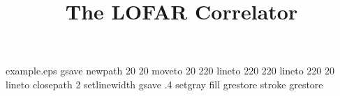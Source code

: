 %
%
%
%
%
\begin{filecontents*}{example.eps}
gsave
newpath
  20 20 moveto
  20 220 lineto
  220 220 lineto
  220 20 lineto
closepath
2 setlinewidth
gsave
  .4 setgray fill
grestore
stroke
grestore
\end{filecontents*}
%
\documentclass{svjour3}                     %
%
\smartqed  %
%
\usepackage{graphicx}
%
\usepackage{mathptmx}      %
%
%
%
%



\title{The LOFAR Correlator%
}


\author{\hbox{John W. Romein \and P. Chris Broekema \and Jan David Mol \and Rob V. van Nieuwpoort}}



